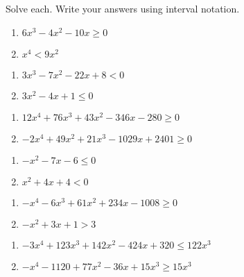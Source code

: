 Solve each. Write your answers using interval notation.
\begin{multicols}{2}
\begin{enumerate}
\item $6x^3-4x^2-10x \geq 0$
\item $x^4 < 9x^2$
\end{enumerate} \setcounter{Review}{\value{enumi}}
\end{multicols}
\begin{multicols}{2}
\begin{enumerate}	\setcounter{enumi}{\value{Review}}
\item $3x^3-7x^2-22x+8 < 0$
\item $3x^2 - 4x + 1 \leq 0$
\end{enumerate} \setcounter{Review}{\value{enumi}}
\end{multicols}
\begin{multicols}{2}
\begin{enumerate}	\setcounter{enumi}{\value{Review}}
\item $12x^4 + 76x^3 + 43x^2 - 346x - 280 \geq 0$
\item $-2x^4 + 49x^2 + 21x^3 - 1029x + 2401 \geq 0$
\end{enumerate} \setcounter{Review}{\value{enumi}}
\end{multicols}
\begin{multicols}{2}
\begin{enumerate}	\setcounter{enumi}{\value{Review}}
\item $-x^2 - 7x - 6 \leq 0$
\item $x^2 + 4x + 4 < 0$
\end{enumerate} \setcounter{Review}{\value{enumi}}
\end{multicols}
\begin{multicols}{2}
\begin{enumerate}	\setcounter{enumi}{\value{Review}}
\item $-x^4 - 6x^3 + 61x^2 + 234x - 1008 \geq 0$
\item $-x^2 + 3x + 1 > 3$
\end{enumerate} \setcounter{Review}{\value{enumi}}
\end{multicols}
\begin{multicols}{2}
\begin{enumerate}	\setcounter{enumi}{\value{Review}}
\item $-3x^4 + 123x^3 + 142x^2 - 424x + 320 \leq 122x^3$
\item $-x^4 - 1120 + 77x^2 - 36x + 15x^3 \geq 15x^3$
\end{enumerate} \setcounter{Review}{\value{enumi}}
\end{multicols}
